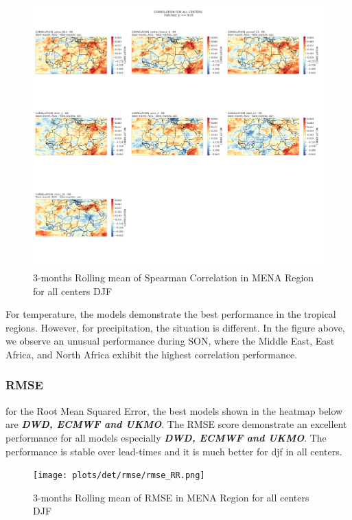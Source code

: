 \begin{figure}[H]
\includegraphics[scale=0.3]{plots/det/corr/CORR_son_RR.png}
\caption{3-months Rolling mean of Spearman Correlation in MENA Region for all centers DJF}
\end{figure}

For temperature, the models demonstrate the best performance in the tropical regions. However, for precipitation, the situation is different. In the figure above, we observe an unusual performance during SON, where the Middle East, East Africa, and North Africa exhibit the highest correlation performance. 


\subsubsection{RMSE}
 
for the Root Mean Squared Error, the best models shown in the heatmap below are \textbf{\textit{DWD, ECMWF and UKMO}}. The RMSE score demonstrate an excellent performance for all models especially \textbf{\textit{DWD, ECMWF and UKMO}}. The performance is stable over lead-times and it is much better for djf in all centers.

\begin{figure}[H]
\texttt{[image: plots/det/rmse/rmse\_RR.png]}
\caption{3-months Rolling mean of RMSE in MENA Region for all centers DJF}
\end{figure}

